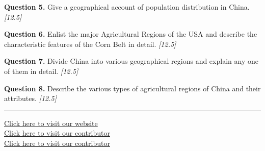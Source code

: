 \documentclass[11pt,a4paper]{article}
\newcommand{\pts}[1]{\hfill   \textit{[#1]}}
\begin{document}
\medskip


\noindent   \textbf{Question 5.} Give a geographical account of population distribution in China. \pts{12.5}

\medskip


\noindent   \textbf{Question 6.} Enlist the major Agricultural Regions of the USA and describe the characteristic features of the Corn Belt in detail. \pts{12.5}

\medskip


\noindent   \textbf{Question 7.} Divide China into various geographical regions and explain any one of them in detail. \pts{12.5}

\medskip


\noindent   \textbf{Question 8.} Describe the various types of agricultural regions of China and their attributes. \pts{12.5}

\vfill\rule{\linewidth}{0.4pt}

\begin{center}\small
\href{https://bhu-exam.vercel.app/}{Click here to visit our website}\\[4pt]
\href{https://me-aryan.vercel.app/}{Click here to visit our contributor}\\[4pt]
\href{https://quashan-me.vercel.app/}{Click here to visit our contributor}
\end{center}
\end{document}
